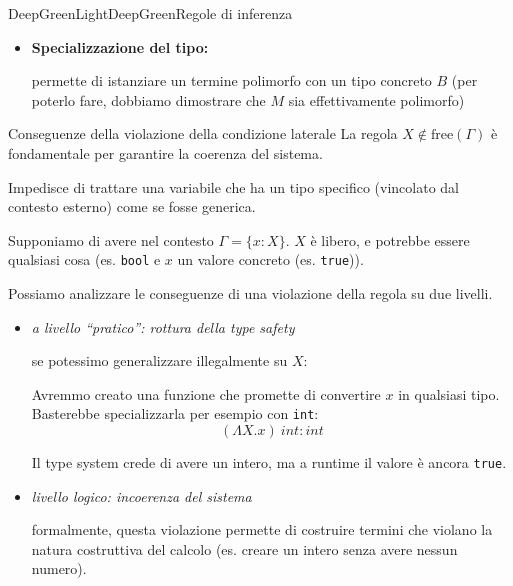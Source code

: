\documentclass[a4paper,11pt]{report}
\begin{document}
\begin{cdefframe}{DeepGreenLight}{DeepGreen}{Regole di inferenza}{}
\begin{itemize}
    \item \textbf{Specializzazione del tipo:}
    \begin{prooftree}
   \end{prooftree}

    \subitem permette di istanziare un termine polimorfo con un tipo concreto \( B \) (per poterlo fare, dobbiamo dimostrare che \( M \) sia effettivamente polimorfo)
\end{itemize}
\end{cdefframe}

\begin{gframe}{Conseguenze della violazione della condizione laterale}{}
    La regola \( X \notin \text{free}(\Gamma) \) è fondamentale per garantire la coerenza del sistema.
    
    Impedisce di trattare una variabile che ha un tipo specifico (vincolato dal contesto esterno) come se fosse generica.

    Supponiamo di avere nel contesto \( \Gamma = \{ x : X \} \).  \( X \) è libero, e potrebbe essere qualsiasi cosa (es. \texttt{bool} e \( x \) un valore concreto (es. \texttt{true})).

    Possiamo analizzare le conseguenze di una violazione della regola su due livelli.
    \begin{itemize}
        \item \textit{a livello ``pratico'': rottura della type safety}
    
    
    se potessimo generalizzare illegalmente su \( X \):
    \begin{prooftree}
    \end{prooftree}
    
    Avremmo creato una funzione che promette di convertire \( x \) in qualsiasi tipo. Basterebbe specializzarla per esempio con \texttt{int}:
    \[ (\Lambda X. x)\ int : int \]
    
 Il type system crede di avere un intero, ma a runtime il valore è ancora \texttt{true}.

\item \textit{livello logico: incoerenza del sistema}
    
    formalmente, questa violazione permette di costruire termini che violano la natura costruttiva del calcolo (es. creare un intero senza avere nessun numero).
    

\end{itemize}
\end{gframe}
\end{document}
